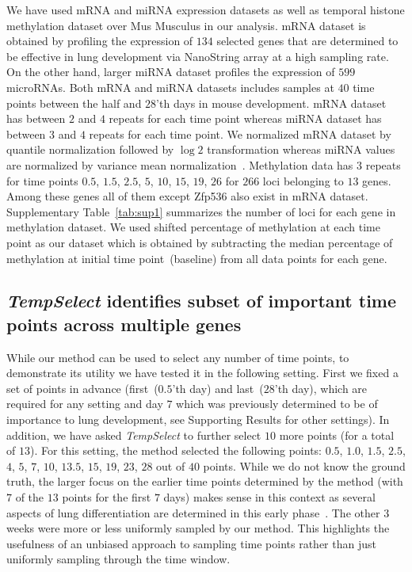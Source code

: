 \documentclass[10pt]{article}
\newcommand{\Tempselect}{\textit{TempSelect}\xspace}
\begin{document}
We have used mRNA and miRNA expression datasets as well as temporal histone
methylation dataset over Mus Musculus in our analysis. mRNA dataset is obtained by profiling the expression of $134$ selected
genes that are determined to be effective in lung development via NanoString array at a
high sampling rate. On the other hand, larger miRNA dataset
profiles the expression of $599$ microRNAs. Both mRNA and
miRNA datasets includes samples at $40$ time points between the half and
$28$'th days in mouse development. mRNA dataset has between $2$ and
$4$ repeats for each time point whereas miRNA dataset has between $3$
and $4$ repeats for each time point. We normalized mRNA dataset by
quantile normalization followed by $\log 2$ transformation whereas
miRNA values are normalized by variance mean normalization~\cite{xxx}. Methylation data has $3$ repeats for time
points $0.5$, $1.5$, $2.5$, $5$, $10$, $15$, $19$, $26$ for $266$ loci
belonging to $13$ genes. Among these genes all of them except Zfp536 also exist in
mRNA dataset. Supplementary Table~\ref{tab:sup1} summarizes the number of loci for each gene in methylation
dataset. We used shifted percentage of methylation at each time
point as our dataset which is obtained by subtracting the median percentage of
methylation at initial time point~(baseline) from all data points for each gene.

\subsection{\Tempselect identifies subset of important time points across multiple genes}\label{sec:findsubset}

While our method can be used to select any number of time points, to demonstrate its utility we have tested it
in the following setting. First we fixed a set of points in advance (first~($0.5$'th day) and
last~($28$'th day), which are required for any setting and day $7$ which was
previously determined to be of importance to lung development, see
Supporting Results for other settings). In addition, we have asked
\Tempselect to further select $10$ more points (for a total of $13$). For
this setting, the method selected the following points: $0.5$,
$1.0$, $1.5$, $2.5$, $4$, $5$, $7$, $10$, $13.5$, $15$, $19$, $23$,
$28$ out of $40$ points. While we do not know the ground truth, the larger focus on the
earlier time points determined by the method (with $7$ of the $13$
points for the first $7$ days) makes sense in this context as several
aspects of lung differentiation are determined in this early phase~\cite{guilliams2013}. The other $3$ weeks were more or less
uniformly sampled by our method. This highlights the usefulness of
an unbiased approach to sampling time points rather than just
uniformly sampling through the time window.
\end{document}
